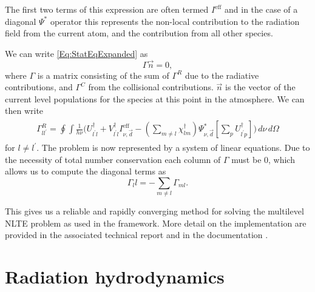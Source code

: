 The first two terms of this expression are often termed $I^\mathrm{eff}$ and in the case of a diagonal $\Psi^*$ operator this represents the non-local contribution to the radiation field from the current atom, and the contribution from all other species.

We can write \eqref{Eq:StatEqExpanded} as
\begin{equation}
    \Gamma \vec{n} = 0,
\end{equation}
where $\Gamma$ is a matrix consisting of the sum of $\Gamma^R$ due to the radiative contributions, and $\Gamma^C$ from the collisional contributions. $\vec{n}$ is the vector of the current level populations for the species at this point in the atmosphere.
We can then write
\begin{align}
\begin{split}\label{Eq:GammaR}
    \Gamma^R_{ll^\prime} = \oint \int \frac{1}{h\nu} \bigg( U^\dagger_{l^\prime l} + V^\dagger_{l^\prime l}I_{\nu, \vec{d}}^\mathrm{eff} -
    \left(\sum_{m\neq l}\chi^\dagger_{lm}\right) \Psi^*_{\nu, \vec{d}} \left[ \sum_p U^\dagger_{l^\prime p} \right] \bigg)\, d\nu\,d\Omega
\end{split}
\end{align}
for $l\neq l^\prime$. The problem is now represented by a system of linear equations. Due to the necessity of total number conservation each column of $\Gamma$ must be 0, which allows us to compute the diagonal terms as
\begin{equation}
    \Gamma_ll = -\sum_{m\neq l} \Gamma_{ml}.
\end{equation}

This gives us a reliable and rapidly converging method for solving the multilevel NLTE problem as used in the \Lw{} framework. More detail on the implementation are provided in the associated technical report \NeedRef{} and in the documentation \NeedRef{}.

\section{Radiation hydrodynamics}
